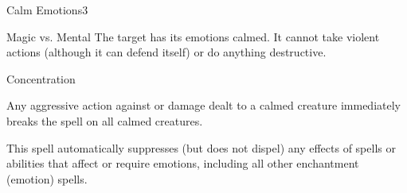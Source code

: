 \begin{spellsection}{Calm Emotions}{3}
    \begin{spellheader}
    \end{spellheader}
    \begin{spellcontent}
        \begin{spelltargetinginfo}
        \end{spelltargetinginfo}
        \begin{spelleffects}
            \begin{spellattack}{Magic vs. Mental}
                \spellsuccess The target has its emotions calmed. It cannot take violent actions (although it can defend itself) or do anything destructive.
            \end{spellattack}
            \spelldur Concentration
        \end{spelleffects}
    \end{spellcontent}
    \begin{spellfooter}
        \spellnotes Any aggressive action against or damage dealt to a calmed creature immediately breaks the spell on all calmed creatures.

        This spell automatically suppresses (but does not dispel) any effects of spells or abilities that affect or require emotions, including all other enchantment (emotion) spells.
        \miscastyou
    \end{spellfooter}
\end{spellsection}


